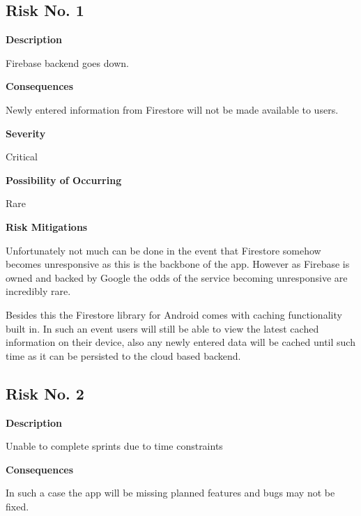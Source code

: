 

\subsection{Risk No. 1}

\textbf{Description}

Firebase backend goes down.

\textbf{Consequences}

Newly entered information from Firestore will not be made available to users.

\textbf{Severity}

Critical

\textbf{Possibility of Occurring}

Rare

\textbf{Risk Mitigations}

Unfortunately not much can be done in the event that Firestore somehow becomes unresponsive as this is the backbone of the app. However as Firebase is owned and backed by Google the odds of the service becoming unresponsive are incredibly rare. 

Besides this the Firestore library for Android comes with caching functionality built in. In such an event users will still be able to view the latest cached information on their device, also any newly entered data will be cached until such time as it can be persisted to the cloud based backend.

\subsection{Risk No. 2}

\textbf{Description}

Unable to complete sprints due to time constraints

\textbf{Consequences}

In such a case the app will be missing planned features and bugs may not be fixed.

